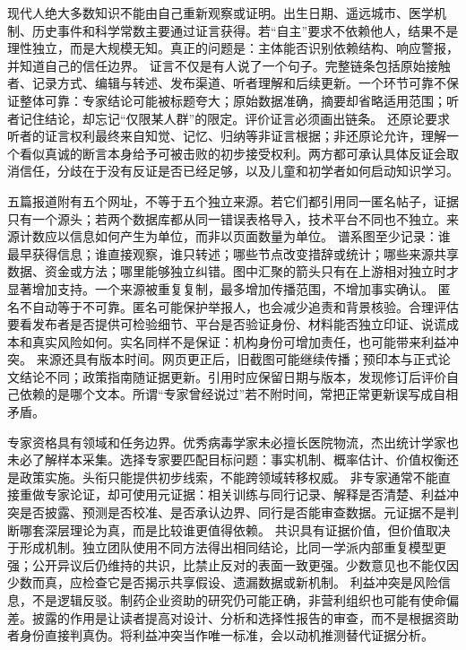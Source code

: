  现代人绝大多数知识不能由自己重新观察或证明。出生日期、遥远城市、医学机制、历史事件和科学常数主要通过证言获得。若“自主”要求不依赖他人，结果不是理性独立，而是大规模无知。真正的问题是：主体能否识别依赖结构、响应警报，并知道自己的信任边界。 证言不仅是有人说了一个句子。完整链条包括原始接触者、记录方式、编辑与转述、发布渠道、听者理解和后续更新。一个环节可靠不保证整体可靠：专家结论可能被标题夸大；原始数据准确，摘要却省略适用范围；听者记住结论，却忘记“仅限某人群”的限定。评价证言必须画出链条。 还原论要求听者的证言权利最终来自知觉、记忆、归纳等非证言根据；非还原论允许，理解一个看似真诚的断言本身给予可被击败的初步接受权利。两方都可承认具体反证会取消信任，分歧在于没有反证是否已经足够，以及儿童和初学者如何启动知识学习\parencite{lackey2008}。

五篇报道附有五个网址，不等于五个独立来源。若它们都引用同一匿名帖子，证据只有一个源头；若两个数据库都从同一错误表格导入，技术平台不同也不独立。来源计数应以信息如何产生为单位，而非以页面数量为单位。 谱系图至少记录：谁最早获得信息；谁直接观察，谁只转述；哪些节点改变措辞或统计；哪些来源共享数据、资金或方法；哪里能够独立纠错。图中汇聚的箭头只有在上游相对独立时才显著增加支持。一个来源被重复复制，最多增加传播范围，不增加事实确认。 匿名不自动等于不可靠。匿名可能保护举报人，也会减少追责和背景核验。合理评估要看发布者是否提供可检验细节、平台是否验证身份、材料能否独立印证、说谎成本和真实风险如何。实名同样不是保证：机构身份可增加责任，也可能带来利益冲突。 来源还具有版本时间。网页更正后，旧截图可能继续传播；预印本与正式论文结论不同；政策指南随证据更新。引用时应保留日期与版本，发现修订后评价自己依赖的是哪个文本。所谓“专家曾经说过”若不附时间，常把正常更新误写成自相矛盾。

专家资格具有领域和任务边界。优秀病毒学家未必擅长医院物流，杰出统计学家也未必了解样本采集。选择专家要匹配目标问题：事实机制、概率估计、价值权衡还是政策实施。头衔只能提供初步线索，不能跨领域转移权威。 非专家通常不能直接重做专家论证，却可使用元证据：相关训练与同行记录、解释是否清楚、利益冲突是否披露、预测是否校准、是否承认边界、同行是否能审查数据。元证据不是判断哪套深层理论为真，而是比较谁更值得依赖。 共识具有证据价值，但价值取决于形成机制。独立团队使用不同方法得出相同结论，比同一学派内部重复模型更强；公开异议后仍维持的共识，比禁止反对的表面一致更强。少数意见也不能仅因少数而真，应检查它是否揭示共享假设、遗漏数据或新机制。 利益冲突是风险信息，不是逻辑反驳。制药企业资助的研究仍可能正确，非营利组织也可能有使命偏差。披露的作用是让读者提高对设计、分析和选择性报告的审查，而不是根据资助者身份直接判真伪。将利益冲突当作唯一标准，会以动机推测替代证据分析。

